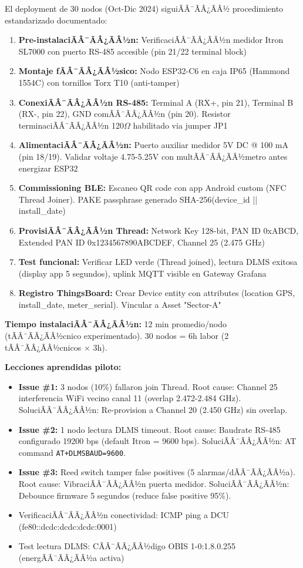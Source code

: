 El deployment de 30 nodos (Oct-Dic 2024) siguiÃÂ¯ÃÂ¿ÃÂ½ procedimiento estandarizado documentado:

\begin{enumerate}
    \item \textbf{Pre-instalaciÃÂ¯ÃÂ¿ÃÂ½n:} VerificaciÃÂ¯ÃÂ¿ÃÂ½n medidor Itron SL7000 con puerto RS-485 accesible (pin 21/22 terminal block)
    \item \textbf{Montaje fÃÂ¯ÃÂ¿ÃÂ½sico:} Nodo ESP32-C6 en caja IP65 (Hammond 1554C) con tornillos Torx T10 (anti-tamper)
    \item \textbf{ConexiÃÂ¯ÃÂ¿ÃÂ½n RS-485:} Terminal A (RX+, pin 21), Terminal B (RX-, pin 22), GND comÃÂ¯ÃÂ¿ÃÂ½n (pin 20). Resistor terminaciÃÂ¯ÃÂ¿ÃÂ½n 120$\Omega$ habilitado via jumper JP1
    \item \textbf{AlimentaciÃÂ¯ÃÂ¿ÃÂ½n:} Puerto auxiliar medidor 5V DC @ 100 mA (pin 18/19). Validar voltaje 4.75-5.25V con multÃÂ¯ÃÂ¿ÃÂ½metro antes energizar ESP32
    \item \textbf{Commissioning BLE:} Escaneo QR code con app Android custom (NFC Thread Joiner). PAKE passphrase generado SHA-256(device\_id || install\_date)
    \item \textbf{ProvisiÃÂ¯ÃÂ¿ÃÂ½n Thread:} Network Key 128-bit, PAN ID 0xABCD, Extended PAN ID 0x1234567890ABCDEF, Channel 25 (2.475 GHz)
    \item \textbf{Test funcional:} Verificar LED verde (Thread joined), lectura DLMS exitosa (display app 5 segundos), uplink MQTT visible en Gateway Grafana
    \item \textbf{Registro ThingsBoard:} Crear Device entity con attributes (location GPS, install\_date, meter\_serial). Vincular a Asset "Sector-A"
\end{enumerate}

\textbf{Tiempo instalaciÃÂ¯ÃÂ¿ÃÂ½n:} 12 min promedio/nodo (tÃÂ¯ÃÂ¿ÃÂ½cnico experimentado). 30 nodos = 6h labor (2 tÃÂ¯ÃÂ¿ÃÂ½cnicos $\times$ 3h).

\textbf{Lecciones aprendidas piloto:}

\begin{itemize}
    \item \textbf{Issue \#1:} 3 nodos (10\%) fallaron join Thread. Root cause: Channel 25 interferencia WiFi vecino canal 11 (overlap 2.472-2.484 GHz). SoluciÃÂ¯ÃÂ¿ÃÂ½n: Re-provision a Channel 20 (2.450 GHz) sin overlap.
    \item \textbf{Issue \#2:} 1 nodo lectura DLMS timeout. Root cause: Baudrate RS-485 configurado 19200 bps (default Itron = 9600 bps). SoluciÃÂ¯ÃÂ¿ÃÂ½n: AT command \texttt{AT+DLMSBAUD=9600}.
    \item \textbf{Issue \#3:} Reed switch tamper false positives (5 alarmas/dÃÂ¯ÃÂ¿ÃÂ½a). Root cause: VibraciÃÂ¯ÃÂ¿ÃÂ½n puerta medidor. SoluciÃÂ¯ÃÂ¿ÃÂ½n: Debounce firmware 5 segundos (reduce false positive 95\%).
    \item VerificaciÃÂ¯ÃÂ¿ÃÂ½n conectividad: ICMP ping a DCU (fe80::dcdc:dcdc:dcdc:0001)
    \item Test lectura DLMS: CÃÂ¯ÃÂ¿ÃÂ½digo OBIS 1-0:1.8.0.255 (energÃÂ¯ÃÂ¿ÃÂ½a activa)
\end{itemize}

